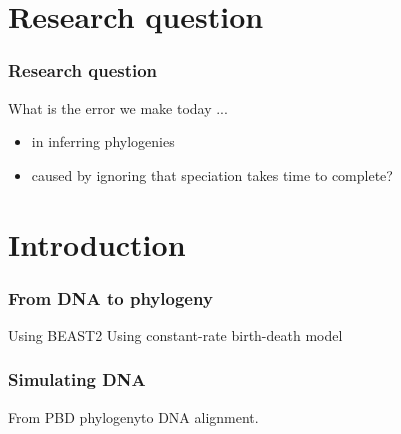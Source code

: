 \documentclass{beamer}
\begin{document}
\section[Research question]{Research question}

\begin{frame}
  \frametitle{Research question}

  What is the error we make today ...

  \begin{itemize}
    \item in inferring phylogenies
    \item caused by ignoring that speciation takes time to complete?
  \end{itemize}

\end{frame}

\section[Introduction]{Introduction}

\begin{frame}
  \frametitle{From DNA to phylogeny}

  Using BEAST2\footnotemark
  Using constant-rate birth-death model\footnotemark



\end{frame}

\begin{frame}
  \frametitle{Simulating DNA}

  From PBD phylogeny\footnotemark to DNA alignment\footnotemark.


\end{frame}
\end{document}
